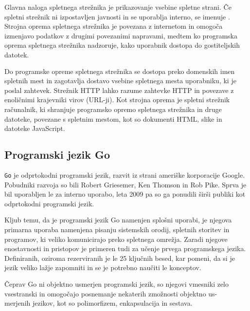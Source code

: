 Glavna naloga spletnega strežnika je prikazovanje vsebine spletne strani. Če spletni strežnik ni izpostavljen javnosti in se uporablja interno, se imenuje . Strojna oprema spletnega strežnika je povezana z internetom in omogoča izmenjavo podatkov z drugimi povezanimi napravami, medtem ko programska oprema spletnega strežnika nadzoruje, kako uporabnik dostopa do gostiteljskih datotek.

Do programske opreme spletnega strežnika se dostopa preko domenskih imen spletnih mest in zagotavlja dostavo vsebine spletnega mesta uporabniku, ki je poslal zahtevek. Strežnik HTTP lahko razume zahtevke HTTP in povezave z enoličnimi krajevniki  virov (URL-ji). Kot strojna oprema je spletni strežnik računalnik, ki shranjuje programsko opremo spletnega strežnika in druge datoteke, povezane s spletnim mestom, kot so dokumenti HTML, slike in datoteke JavaScript.



\subsection{Programski jezik Go}

\verb=Go= je odprtokodni programski jezik, razvit iz strani ameriške korporacije Google. Pobudniki razvoja so bili Robert Griesemer, Ken Thomson in Rob Pike. Sprva je bil uporabljen le za interno uporabo, leta 2009 pa so ga ponudili širši publiki kot odprtokodni programski jezik.

Kljub temu, da je programski jezik Go namenjen splošni uporabi, je njegova primarna uporaba namenjena pisanju sistemskih orodij, spletnih storitev in programov, ki veliko komunicirajo preko  spletnega omrežja. Zaradi njegove enostavnosti in pristopov je primeren tudi za učenje prvega programskega jezika. Definiranih, oziroma rezerviranih je le 25 ključnih besed, kar pomeni, da si je jezik veliko lažje zapomniti in se je potrebno naučiti le konceptov.

Čeprav Go ni objektno usmerjen programski jezik, so njegovi vmesniki zelo vsestranski in omogočajo posnemanje nekaterih zmožnosti objektno us-\\merjenih jezikov, kot so polimorfizem, enkapsulacija in sestava.

